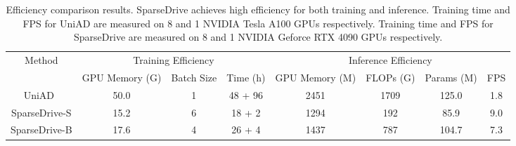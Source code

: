 \begin{table}[htbp]
\centering
\caption{Efficiency comparison results. SparseDrive achieves high efficiency for both training and inference. Training time and FPS for UniAD are measured on 8 and 1 NVIDIA Tesla A100 GPUs respectively. Training time and FPS for SparseDrive are measured on 8 and 1 NVIDIA Geforce RTX 4090 GPUs respectively.}
\label{tab:efficiency}
\vspace{5pt}
\resizebox{0.90\linewidth}{!}
{    
\begin{tabular}{c|ccc|cccc}
\toprule
\multirow{2}{*}{Method} &
\multicolumn{3}{c|}{Training Efficiency} & 
\multicolumn{4}{c}{Inference Efficiency} \\
& GPU Memory (G) & Batch Size & Time (h) & GPU Memory (M) & FLOPs (G) & Params (M) & FPS\\
\midrule
UniAD~\cite{uniad} & 50.0 & 1 & 48 + 96 & 2451 & 1709 & 125.0 & 1.8 \\
\midrule
SparseDrive-S & 15.2 & 6 & 18 + 2 & 1294 & 192 & 85.9 & 9.0 \\
SparseDrive-B & 17.6 & 4 & 26 + 4 & 1437 & 787 & 104.7 & 7.3 \\
\bottomrule
\end{tabular}
}
\end{table} 